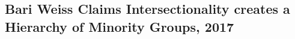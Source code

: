 \subsection{Bari Weiss Claims Intersectionality creates a Hierarchy of Minority Groups, 2017}
\blindtext \par
\blindtext \par
\blindtext \par
\blindtext \par
